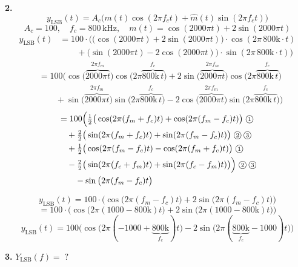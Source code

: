 \documentclass[11pt,a4paper]{article}
\begin{document}
\noindent\textbf{2.}
\[ y_{\mathrm{LSB}}(t)=A_c\big(m(t)\cos(2\pi f_c t)+\hat m(t)\sin(2\pi f_c t)\big) \]
\[ A_c=100,\quad f_c=800\,\mathrm{kHz},\quad m(t)=\cos(2000\pi t)+2\sin(2000\pi t) \]
\begin{align*}
y_{\mathrm{LSB}}(t)&=100\cdot\Big(\big(\cos(2000\pi t)+2\sin(2000\pi t)\big)\cdot\cos(2\pi\,800\mathrm{k}\cdot t)\\
&\qquad+\big(\sin(2000\pi t)-2\cos(2000\pi t)\big)\cdot\sin(2\pi\,800\mathrm{k}\cdot t)\Big)
\end{align*}
\begin{align*}
&=100\Big(\cos\big(\overbrace{2000\pi t}^{2\pi f_m}\big)\cos\big(2\pi\overbrace{800\mathrm{k}\,t}^{f_c}\big)+2\sin\big(\overbrace{2000\pi t}^{2\pi f_m}\big)\cos\big(2\pi\overbrace{800\mathrm{k}\,t}^{f_c}\big)\\
&\qquad+\sin\big(\overbrace{2000\pi t}^{2\pi f_m}\big)\sin\big(2\pi\overbrace{800\mathrm{k}\,t}^{f_c}\big)-2\cos\big(\overbrace{2000\pi t}^{2\pi f_m}\big)\sin\big(2\pi\overbrace{800\mathrm{k}\,t}^{f_c}\big)\Big)
\end{align*}
\begin{align*}
&=100\Big(\tfrac{1}{2}\big(\cos(2\pi(f_m+f_c)t)+\cos(2\pi(f_m-f_c)t)\big)\;\text{\textcircled{\scriptsize 1}}\\
&\quad+\tfrac{2}{2}\big(\sin(2\pi(f_m+f_c)t)+\sin(2\pi(f_m-f_c)t)\big)\;\text{\textcircled{\scriptsize 2}}\,\text{\textcircled{\scriptsize 3}}\\
&\quad+\tfrac{1}{2}\big(\cos(2\pi(f_m-f_c)t)-\cos(2\pi(f_m+f_c)t)\big)\;\text{\textcircled{\scriptsize 1}}\\
&\quad-\tfrac{2}{2}\big(\sin(2\pi(f_c+f_m)t)+\sin(2\pi(f_c-f_m)t)\big)\Big)\;\text{\textcircled{\scriptsize 2}}\,\text{\textcircled{\scriptsize 3}}\\
&\qquad-\sin\big(2\pi(f_m-f_c)t\big)
\end{align*}

\[ y_{\mathrm{LSB}}(t)=100\cdot\Big(\cos\big(2\pi(f_m-f_c)t\big)+2\sin\big(2\pi(f_m-f_c)t\big)\Big) \]
\[ =100\cdot\Big(\cos\big(2\pi(1000-800\mathrm{k})t\big)+2\sin\big(2\pi(1000-800\mathrm{k})t\big)\Big) \]
\[ y_{\mathrm{LSB}}(t)=100\Big(\cos\big(2\pi(-1000+\underbrace{800\mathrm{k}}_{f_c})t\big)-2\sin\big(2\pi(\underbrace{800\mathrm{k}}_{f_c}-1000)t\big)\Big) \]

\noindent\textbf{3.} $Y_{\mathrm{LSB}}(f)=\;?$
\end{document}
